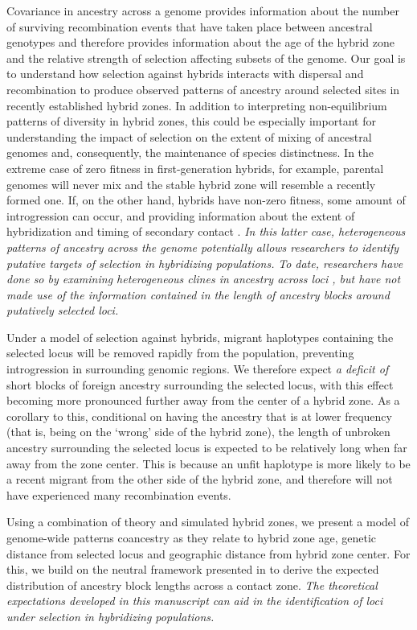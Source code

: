 \documentclass[11pt,letterpaper]{article}
\newcommand{\yb}[1]{{\em \color{magenta} #1}}
\begin{document}
Covariance in ancestry across a genome provides information about the number of surviving recombination events that have taken place between ancestral genotypes and therefore provides information about the age of the hybrid zone and the relative strength of selection affecting subsets of the genome. Our goal is to understand how selection against hybrids interacts with dispersal and recombination to produce observed patterns of ancestry around selected sites in recently established hybrid zones. In addition to interpreting non-equilibrium patterns of diversity in hybrid zones, this could be especially important for understanding the impact of selection on the extent of mixing of ancestral genomes and, consequently, the maintenance of species distinctness. In the extreme case of zero fitness in first-generation hybrids, for example, parental genomes will never mix and the stable hybrid zone will resemble a recently formed one. 
If, on the other hand, hybrids have non-zero fitness, some amount of introgression can occur, and providing information about the extent of hybridization and timing of secondary contact \citep{Price2009, Hellenthal2014}. 
\yb{In this latter case, heterogeneous patterns of ancestry across the genome potentially allows researchers to identify putative targets of selection in hybridizing populations.}  
\yb{To date, researchers have done so by examining heterogeneous clines in ancestry across loci \citep{Porter1997, Gompert2012}, but have not made use of the information contained in the length of ancestry blocks around putatively selected loci.}  

Under a model of selection against hybrids, migrant haplotypes containing the selected locus will be removed rapidly from the population, preventing introgression in surrounding genomic regions. We therefore expect \yb{a deficit of} short blocks of foreign ancestry surrounding the selected locus, with this effect becoming more pronounced further away from the center of a hybrid zone. As a corollary to this, conditional on having the ancestry that is at lower frequency (that is, being on the `wrong' side of the hybrid zone), the length of unbroken ancestry surrounding the selected locus is expected to be relatively long when far away from the zone center.  This is because an unfit haplotype is more likely to be a recent migrant from the other side of the hybrid zone, and therefore will not have experienced many recombination events. 

Using a combination of theory and simulated hybrid zones, we present a model of genome-wide patterns coancestry as they relate to hybrid zone age, genetic distance from selected locus and geographic distance from hybrid zone center. For this, we build on the neutral framework presented in \citet{Sedghifar2015} to derive the expected distribution of ancestry block lengths across a contact zone.  
\yb{The theoretical expectations developed in this manuscript can aid in the identification of loci under selection in hybridizing populations.} 
\end{document}
